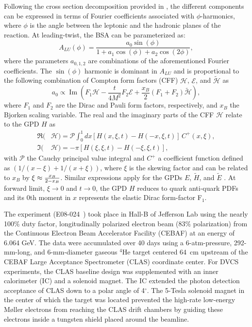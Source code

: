 \documentclass[twocolumn,nofootinbib,prl,superscriptaddress,secnumarabic,amssymb,nobibnotes,aps,floatfix]{revtex4}
\begin{document}
Following the cross section decomposition provided in \cite{Belitsky:2001ns}, 
the different components can be expressed in terms of Fourier coefficients 
associated with $\phi$-harmonics, where $\phi$ is the angle between the 
leptonic and the hadronic planes of the reaction. At leading-twist, the BSA can 
be parameterized as: 
\begin{equation}
   A_{LU}(\phi) = \frac{a_{0}\sin(\phi)}{1+a_{1}\cos(\phi)+a_{2}\cos(2\phi)},
   \label{eq:alu-simp}
\end{equation}
where the parameters $a_{0,1,2}$ are combinations of the aforementioned Fourier 
coefficients. The $\sin(\phi)$ harmonic is dominant in $A_{LU}$ and is 
proportional to the following combination of Compton form factors (CFF) 
$\mathcal{H}$, $\mathcal{E}$, and $\tilde{\mathcal{H}}$ as  
\cite{Guidal:2013rya}
\begin{equation}
   a_{0} \propto \operatorname{Im}( F_1 \mathcal{H}- \frac{t}{4M^2} F_2 
   \mathcal{E}+ \frac{x_B}{2}(F_1+F_2)\tilde{\mathcal{H}}),
   \label{a0_cff}
\end{equation}
where $F_1$ and $F_2$ are the Dirac and Pauli form factors, respectively, and 
$x_B$ the Bjorken scaling variable. The real and the imaginary parts of the CFF 
$\mathcal{H}$ relate to the GPD $H$ as  \begin{align}
   \Re(&\mathcal{H}) = \mathcal{P} \int_{0}^{1}dx[H(x,\xi,t)-H(-x,\xi,t)] \, 
   C^{+}(x,\xi), \\
   \Im(&\mathcal{H}) = - \pi [H(\xi,\xi,t)-H(-\xi,\xi,t)],
\end{align}
with $\mathcal{P}$ the Cauchy principal value integral and $C^{+}$ a 
coefficient function defined as $(1/(x-\xi) + 1/(x+\xi))$, where $\xi$ is the 
skewing factor and can be related to $x_B$ by $\xi\approx {{x_B}\over{2-x_B}}$.  
Similar expressions apply for the GPDs $E$, $\widetilde{H}$, and 
$\widetilde{E}$ \cite{Guidal:2013rya}. At forward limit, $\xi\to 0$ and $t \to 0$, the GPD $H$ reduces to quark anti-quark PDFs and its 0th moment in $x$ represents the elastic Dirac form-factor F$_1$.


The experiment (E08-024~\cite{Hafidi:2008pr}) took place in Hall-B of Jefferson 
Lab using the nearly 100\% duty factor, longitudinally polarized electron beam 
(83$\%$ polarization) from the Continuous Electron Beam Accelerator Facility 
(CEBAF) at an energy of 6.064 GeV. The data were accumulated over 40 days using 
a 6-atm-pressure, 292-mm-long, and 6-mm-diameter gaseous $^4$He target centered 
64~cm upstream of the CEBAF Large Acceptance Spectrometer (CLAS) coordinate 
center. For DVCS experiments, the CLAS baseline design \cite{Mecking:2003zu} 
was supplemented with an inner calorimeter (IC) and a solenoid magnet. The IC 
extended the photon detection acceptance of CLAS down to a polar angle of 
4$^{\circ}$. The 5-Tesla solenoid magnet in the center of which the target was 
located prevented the high-rate low-energy M{\o}ller electrons from reaching 
the CLAS drift chambers by guiding these electrons inside a tungsten shield 
placed around the beamline. 
\end{document}
